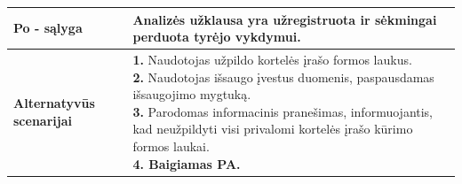 \documentclass[12pt]{article}
\begin{document}
\begin{table}[htb!]
\begin{tabular}{|m{3cm}|m{13.7cm}|}
        \hline
        \raggedleft \textbf{\cellcolor{deepchampagne}Po - sąlyga} &
        Analizės užklausa yra užregistruota ir sėkmingai perduota tyrėjo
        vykdymui. \\
        \hline
        \raggedleft \textbf{\cellcolor{deepchampagne}Alternatyvūs scenarijai} &
        \vskip 5pt
        \makecell[l]{\parbox[t]{13.7cm}{
            \textbf{1.} \textcolor{dartmouthgreen}{Naudotojas užpildo kortelės
            įrašo formos laukus.} \\
            \textbf{2.} \textcolor{dartmouthgreen}{Naudotojas išsaugo įvestus
            duomenis, paspausdamas išsaugojimo mygtuką.} \\
            \textbf{3.} Parodomas informacinis pranešimas, informuojantis, kad
            neužpildyti visi privalomi kortelės įrašo kūrimo formos laukai. \\
            \textbf{4. Baigiamas PA.}
        }}
        \\
        \hline
    \end{tabular}
\end{table}

\newpage
\end{document}
